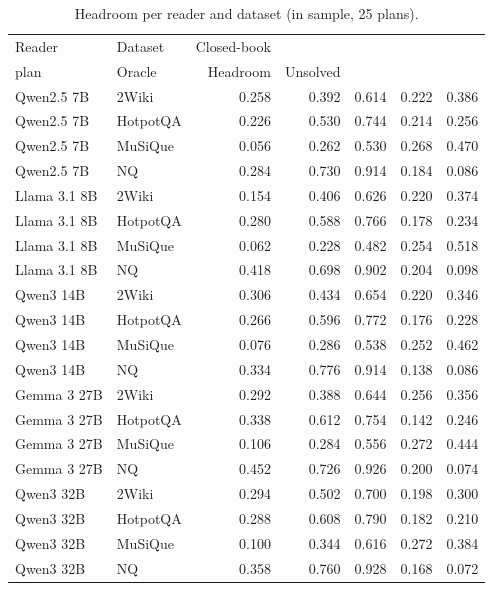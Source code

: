 \begin{table}[t]
\centering\small
\setlength{\tabcolsep}{4pt}
\caption{Headroom per reader and dataset (in sample, 25 plans).}
\label{tab:headroom}
\begin{tabular*}{\linewidth}{@{\extracolsep{\fill}}llrrrrr}
\toprule
Reader & Dataset & Closed-book & \begin{tabular}[b]{@{}r@{}}Best fixed \\ plan\end{tabular} & Oracle & Headroom & Unsolved \\
\midrule
Qwen2.5 7B & 2Wiki & 0.258 & 0.392 & 0.614 & 0.222 & 0.386 \\
Qwen2.5 7B & HotpotQA & 0.226 & 0.530 & 0.744 & 0.214 & 0.256 \\
Qwen2.5 7B & MuSiQue & 0.056 & 0.262 & 0.530 & 0.268 & 0.470 \\
Qwen2.5 7B & NQ & 0.284 & 0.730 & 0.914 & 0.184 & 0.086 \\
Llama 3.1 8B & 2Wiki & 0.154 & 0.406 & 0.626 & 0.220 & 0.374 \\
Llama 3.1 8B & HotpotQA & 0.280 & 0.588 & 0.766 & 0.178 & 0.234 \\
Llama 3.1 8B & MuSiQue & 0.062 & 0.228 & 0.482 & 0.254 & 0.518 \\
Llama 3.1 8B & NQ & 0.418 & 0.698 & 0.902 & 0.204 & 0.098 \\
Qwen3 14B & 2Wiki & 0.306 & 0.434 & 0.654 & 0.220 & 0.346 \\
Qwen3 14B & HotpotQA & 0.266 & 0.596 & 0.772 & 0.176 & 0.228 \\
Qwen3 14B & MuSiQue & 0.076 & 0.286 & 0.538 & 0.252 & 0.462 \\
Qwen3 14B & NQ & 0.334 & 0.776 & 0.914 & 0.138 & 0.086 \\
Gemma 3 27B & 2Wiki & 0.292 & 0.388 & 0.644 & 0.256 & 0.356 \\
Gemma 3 27B & HotpotQA & 0.338 & 0.612 & 0.754 & 0.142 & 0.246 \\
Gemma 3 27B & MuSiQue & 0.106 & 0.284 & 0.556 & 0.272 & 0.444 \\
Gemma 3 27B & NQ & 0.452 & 0.726 & 0.926 & 0.200 & 0.074 \\
Qwen3 32B & 2Wiki & 0.294 & 0.502 & 0.700 & 0.198 & 0.300 \\
Qwen3 32B & HotpotQA & 0.288 & 0.608 & 0.790 & 0.182 & 0.210 \\
Qwen3 32B & MuSiQue & 0.100 & 0.344 & 0.616 & 0.272 & 0.384 \\
Qwen3 32B & NQ & 0.358 & 0.760 & 0.928 & 0.168 & 0.072 \\
\bottomrule
\end{tabular*}
\end{table}
